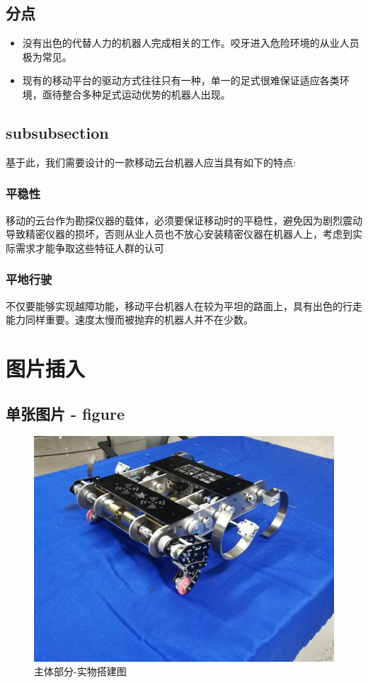\documentclass[12pt]{article}
\begin{document}
\begin{CJK}{UTF8}{gbsn}
\subsection{分点}
\begin{itemize}
\item 没有出色的代替人力的机器人完成相关的工作。咬牙进入危险环境的从业人员极为常见。
\item 现有的移动平台的驱动方式往往只有一种，单一的足式很难保证适应各类环境，亟待整合多种足式运动优势的机器人出现。
\end{itemize}

\subsection{subsubsection}
\label{sec:features}
基于此，我们需要设计的一款移动云台机器人应当具有如下的特点:

\subsubsection{平稳性}
\label{sec:requirements}
移动的云台作为勘探仪器的载体，必须要保证移动时的平稳性，避免因为剧烈震动导致精密仪器的损坏，否则从业人员也不放心安装精密仪器在机器人上，考虑到实际需求才能争取这些特征人群的认可

\subsubsection{平地行驶}
\label{sec:format}
不仅要能够实现越障功能，移动平台机器人在较为平坦的路面上，具有出色的行走能力同样重要。速度太慢而被抛弃的机器人并不在少数。


\newpage                                    %

\section{图片插入}
\subsection{单张图片 - figure}

\begin{figure}[H]
\centering
\includegraphics[width=.8\textwidth]{chap2//fig1.jpg}
\caption{主体部分-实物搭建图}
\end{figure}


\end{CJK}
\end{document}
